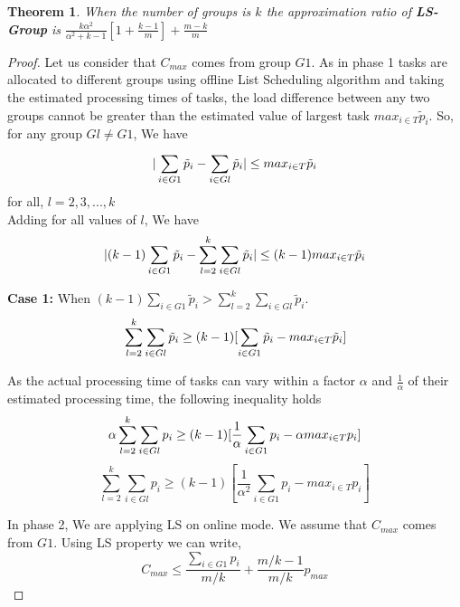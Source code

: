 \documentclass[10pt, conference, compsocconf]{IEEEtran}
\newtheorem{theorem}{Theorem}[section]
\begin{document}
\begin{theorem}
When the number of groups is $k$ the approximation ratio of \textbf{LS-Group } is $  \frac{k\alpha^{2}}{\alpha^{2}+k-1}[1+ {\frac{k-1}{m}} ]+ {\frac{m-k}{m}}   $ 
\end{theorem}
\begin{proof} 
Let us consider  that $ C_{max}$ comes from group $G1$.  As in phase 1 tasks are allocated to different groups using offline List Scheduling algorithm and taking the estimated processing times of tasks, the load difference between any two groups cannot be greater than the estimated value of largest task ${max_{i \in T}}{\tilde p_{i}}$.  So, for any group $Gl \neq G1$, We have
\begin{equation}{\nonumber}
|\sum_{i \in G1 }^{}{\tilde p_{i}}- \sum_{i \in Gl }^{}{\tilde p_{i}}| \leq {max_{i \in T}}{\tilde p_{i}}\end{equation}  \hspace*{15pt}   for all, $l = 2,3,...,k$ \\ 
Adding for all values of $l$, We have 
\begin{equation}{\nonumber}
|(k-1)\sum_{i \in G1 }^{}{\tilde p_{i}}- \sum_{l=2}^{k}\sum_{i \in Gl }^{}{\tilde p_{i}}| \leq (k-1) {max_{i \in T}}{\tilde p_{i}}
\end{equation}

\textbf{Case 1:} When $(k-1)\sum_{i \in G1 }^{}{\tilde p_{i}} > \sum_{l=2}^{k}\sum_{i \in Gl }^{}{\tilde p_{i}}$.
\begin{equation}{\nonumber}
 \sum_{l=2}^{k}\sum_{i \in Gl }^{}{\tilde p_{i}} \geq (k-1)[\sum_{i \in G1 }^{}{\tilde p_{i}}- {max_{i \in T}}{\tilde p_{i}}]
\end{equation}

As the actual processing time of tasks  can vary within a factor $\alpha$ and $\frac{1}{\alpha}$ of their estimated processing time, the following inequality holds
\begin{equation}{\nonumber}
 \alpha\sum_{l=2}^{k}\sum_{i \in Gl }^{}{{p_{i}}} \geq (k-1)[\frac{1}{\alpha}\sum_{i \in G1 }^{}{{p_{i}}}- \alpha {max_{i \in T}}{{p_{i}}}]
\end{equation}
\begin{equation}\label{eq9}
\sum_{l=2}^{k}\sum_{i \in Gl }^{}{{p_{i}}} \geq (k-1)[\frac{1}{\alpha^{2}}\sum_{i \in G1 }^{}{{p_{i}}}-  {max_{i \in T}}{{p_{i}}}]
\end{equation}

In phase 2, We are applying LS on online mode. We assume that $C_{max}$ comes from $G1$. Using LS property we can write,
\begin{equation}\label{eq10}
 C_{max} \leq \frac{\sum_{i \in G1 }^{}{{p_{i}}}}{m/k} + {\frac{m/k-1}{m/k}} p_{max}
\end{equation}


\end{proof}
\end{document}
